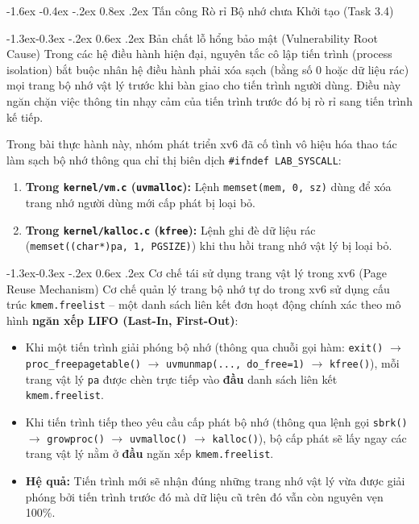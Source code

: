 \documentclass[11pt,a4paper]{article}
\makeatletter
\renewcommand\section{\@startsection {section}{1}{\z@}%
                                   {-1.6ex \@plus -0.4ex \@minus -.2ex}%
                                   {0.8ex \@plus .2ex}%
                                   {\normalfont\large\bfseries\color{headerblue}}}
\renewcommand\subsection{\@startsection{subsection}{2}{\z@}%
                                     {-1.3ex\@plus -0.3ex \@minus -.2ex}%
                                     {0.6ex \@plus .2ex}%
                                     {\normalfont\normalsize\bfseries}}
\makeatother
\begin{document}
\clearpage

\section{Tấn công Rò rỉ Bộ nhớ chưa Khởi tạo (Task 3.4)}

\subsection{Bản chất lỗ hổng bảo mật (Vulnerability Root Cause)}
Trong các hệ điều hành hiện đại, nguyên tắc cô lập tiến trình (process isolation) bắt buộc nhân hệ điều hành phải xóa sạch (bằng số 0 hoặc dữ liệu rác) mọi trang bộ nhớ vật lý trước khi bàn giao cho tiến trình người dùng. Điều này ngăn chặn việc thông tin nhạy cảm của tiến trình trước đó bị rò rỉ sang tiến trình kế tiếp.

Trong bài thực hành này, nhóm phát triển xv6 đã cố tình vô hiệu hóa thao tác làm sạch bộ nhớ thông qua chỉ thị biên dịch \texttt{\#ifndef LAB\_SYSCALL}:
\begin{enumerate}
    \item \textbf{Trong \texttt{kernel/vm.c} (\texttt{uvmalloc}):} Lệnh \texttt{memset(mem, 0, sz)} dùng để xóa trang nhớ người dùng mới cấp phát bị loại bỏ.
    \item \textbf{Trong \texttt{kernel/kalloc.c} (\texttt{kfree}):} Lệnh ghi đè dữ liệu rác (\texttt{memset((char*)pa, 1, PGSIZE)}) khi thu hồi trang nhớ vật lý bị loại bỏ.
\end{enumerate}

\subsection{Cơ chế tái sử dụng trang vật lý trong xv6 (Page Reuse Mechanism)}
Cơ chế quản lý trang bộ nhớ tự do trong xv6 sử dụng cấu trúc \texttt{kmem.freelist} -- một danh sách liên kết đơn hoạt động chính xác theo mô hình \textbf{ngăn xếp LIFO (Last-In, First-Out)}:
\begin{itemize}
    \item Khi một tiến trình giải phóng bộ nhớ (thông qua chuỗi gọi hàm: \texttt{exit()} $\rightarrow$ \texttt{proc\_freepagetable()} $\rightarrow$ \texttt{uvmunmap(..., do\_free=1)} $\rightarrow$ \texttt{kfree()}), mỗi trang vật lý \texttt{pa} được chèn trực tiếp vào \textbf{đầu} danh sách liên kết \texttt{kmem.freelist}.
    \item Khi tiến trình tiếp theo yêu cầu cấp phát bộ nhớ (thông qua lệnh gọi \texttt{sbrk()} $\rightarrow$ \texttt{growproc()} $\rightarrow$ \texttt{uvmalloc()} $\rightarrow$ \texttt{kalloc()}), bộ cấp phát sẽ lấy ngay các trang vật lý nằm ở \textbf{đầu} ngăn xếp \texttt{kmem.freelist}.
    \item \textbf{Hệ quả:} Tiến trình mới sẽ nhận đúng những trang nhớ vật lý vừa được giải phóng bởi tiến trình trước đó mà dữ liệu cũ trên đó vẫn còn nguyên vẹn 100\%.
\end{itemize}
\end{document}
